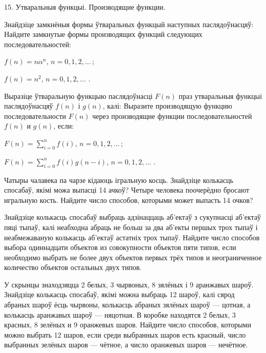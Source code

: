 



\biLangHeader
{15. Утваральныя функцыі.}
{Производящие функции.}

\begin{problemList}

\problemItemWithCommonPart
{Знайдзіце замкнёныя формы ўтваральных функцый наступных паслядоўнасцяў:}
{Найдите замкнутые формы производящих функций следующих последовательностей:}
{\begin{belarusianEnumerate}
  \item $f(n) = n\alpha^n$, $n = 0, 1, 2, \ldots\, $;
  \item $f(n) = n^2$, $n = 0, 1, 2, \ldots\,\, $.
\end{belarusianEnumerate}}

\problemItemWithCommonPart
{Выразіце ўтваральную функцыю паслядоўнасці $F(n)$ праз утваральныя функцыі
паслядоўнасцяў $f(n)$ і $g(n)$, калі:}
{Выразите производящую функцию последовательности $F(n)$ через производящие
функции последовательностей $f(n)$ и $g(n)$, если:}
{\begin{belarusianEnumerate}
  \item $F(n) = \sum_{i = 0}^n f(i)$, $n = 0, 1, 2, \ldots\, $;
  \item $F(n) = \sum_{i = 0}^n f(i)g(n - i)$, $n = 0, 1, 2, \ldots\,\, $.
\end{belarusianEnumerate}}

\problemItemSimple
{Чатыры чалавека па чарзе кідаюць ігральную косць. Знайдзіце колькасць спосабаў,
якімі можа выпасці 14 ачкоў?}
{Четыре человека поочерёдно бросают игральную кость. Найдите число способов,
которыми может выпасть 14 очков?}

\problemItemSimple
{Знайдзіце колькасць спосабаў выбраць адзінаццаць аб'ектаў з сукупнасці аб'ектаў
пяці тыпаў, калі неабходна абраць не больш за два аб'екты першых трох тыпаў і неабмежаваную
колькасць аб'ектаў астатніх трох тыпаў.}
{Найдите число способов выбора одиннадцати объектов из совокупности объектов
пяти типов, если необходимо выбрать не более двух объектов первых трёх типов и
неограниченное количество объектов остальных двух типов.}

\problemItemSimple
{У скрынцы знаходзяцца 2 белых, 3 чырвоных, 8 зялёных і 9 аранжавых шароў.
Знайдзіце колькасць спосабаў, якімі можна выбраць 12 шароў, калі сярод абраных шароў
ёсць чырвоны, колькасць абраных зялёных шароў --- цотная, а колькасць аранжавых шароў --- няцотная.}
{В коробке находятся 2 белых, 3 красных, 8 зелёных и 9 оранжевых шаров.
Найдите число способов, которыми можно выбрать 12 шаров, если среди выбранных шаров
есть красный, число выбранных зелёных шаров --- чётное, а число оранжевых шаров --- нечётное.}


\end{problemList}
